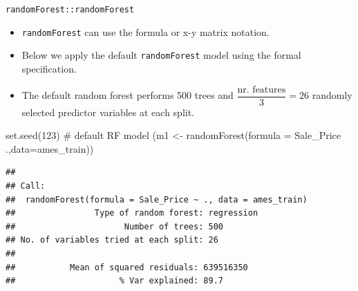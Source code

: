 \documentclass[
  10pt,
  ignorenonframetext,
]{beamer}
\newenvironment{Shaded}{}{}
\newcommand{\CommentTok}[1]{\textcolor[rgb]{0.00,0.50,0.00}{#1}}
\newcommand{\DataTypeTok}[1]{#1}
\newcommand{\DecValTok}[1]{#1}
\newcommand{\KeywordTok}[1]{\textcolor[rgb]{0.00,0.00,1.00}{#1}}
\newcommand{\NormalTok}[1]{#1}
\newcommand{\OperatorTok}[1]{#1}
\newcommand{\StringTok}[1]{\textcolor[rgb]{0.00,0.50,0.50}{#1}}
\providecommand{\tightlist}{%
  \setlength{\itemsep}{0pt}\setlength{\parskip}{0pt}}
\begin{document}
\begin{frame}[fragile]{\texttt{randomForest::randomForest}}
\protect\hypertarget{randomforestrandomforest}{}

\begin{itemize}
\tightlist
\item
  \texttt{randomForest} can use the formula or x-y matrix notation.
\item
  Below we apply the default \texttt{randomForest} model using the
  formal specification.
\item
  The default random forest performs 500 trees and
  \(\dfrac{\text{nr. features}}{3}=26\) randomly selected predictor
  variables at each split.
\end{itemize}

\begin{Shaded}
\begin{Highlighting}[]
\KeywordTok{set.seed}\NormalTok{(}\DecValTok{123}\NormalTok{)}
\CommentTok{# default RF model}
\NormalTok{(m1 <-}\StringTok{ }\KeywordTok{randomForest}\NormalTok{(}\DataTypeTok{formula =}\NormalTok{ Sale_Price }\OperatorTok{~}\StringTok{ }\NormalTok{.,}\DataTypeTok{data=}\NormalTok{ames_train))}
\end{Highlighting}
\end{Shaded}

\begin{verbatim}
## 
## Call:
##  randomForest(formula = Sale_Price ~ ., data = ames_train) 
##                Type of random forest: regression
##                      Number of trees: 500
## No. of variables tried at each split: 26
## 
##           Mean of squared residuals: 639516350
##                     % Var explained: 89.7
\end{verbatim}

\end{frame}
\end{document}
